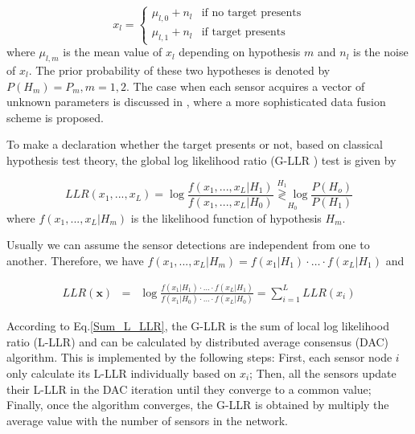 \begin{equation}
x_{l}=\begin{cases}
\mu_{l,0}+n_{l} & \mbox{if no target presents}\\
\mu_{l,1}+n_{l} & \mbox{if target presents}
\end{cases}
\end{equation}
where $\mu_{l,m}$ is the mean value of $x_{l}$ depending on hypothesis
$m$ and $n_{l}$ is the noise of $x_{l}$. The prior probability
of these two hypotheses is denoted by $P\left(H_{m}\right)=P_{m},m=1,2$.
The case when each sensor acquires a vector of unknown parameters
is discussed in \cite{Xiao2005}, where a more sophisticated data
fusion scheme is proposed.   

To make a declaration whether the target presents or not, based on
classical hypothesis test theory, the global log likelihood ratio
(G-LLR ) test is given by 

\begin{equation}
LLR(x_{1},...,x_{L})=\log\frac{f\left(x_{1},...,x_{L}|H_{1}\right)}{f\left(x_{1},...,x_{L}|H_{0}\right)}\underset{H_{0}}{\overset{H_{1}}{\gtrless}\log}\frac{P\left(H_{o}\right)}{P\left(H_{1}\right)}\label{eq:G-LLR define}
\end{equation}
where $f\left(x_{1},...,x_{L}|H_{m}\right)$ is the likelihood function
of hypothesis $H_{m}$.

Usually  we can assume the sensor detections are independent from
one to another. Therefore, we have $f\left(x_{1},...,x_{L}|H_{m}\right)=f\left(x_{1}|H_{1}\right)\cdot\ldots\cdot f\left(x_{L}|H_{1}\right)$
and 

\begin{eqnarray}
LLR(\mathbf{x}) & = & \log\frac{f\left(x_{1}|H_{1}\right)\cdot\ldots\cdot f\left(x_{L}|H_{1}\right)}{f\left(x_{1}|H_{0}\right)\cdot\ldots\cdot f\left(x_{L}|H_{0}\right)}=\sum_{i=1}^{L}LLR\left(x_{i}\right)\label{eq:Sum_L_LLR}
\end{eqnarray}


According to Eq.\eqref{Sum_L_LLR}, the G-LLR is the sum of local
log likelihood ratio (L-LLR) and can be calculated by distributed
average consensus (DAC) algorithm. This is implemented by the following
steps: First, each sensor node $i$ only calculate its L-LLR individually
based on $x_{i}$; Then, all the sensors update their L-LLR in the
DAC iteration until they converge to a common value; Finally, once
the algorithm converges, the G-LLR is obtained by multiply the average
value with the number of sensors in the network.


